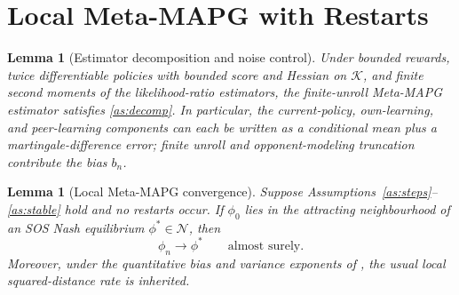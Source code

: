 \documentclass{article}
\theoremstyle{plain}
\newtheorem{lemma}[theorem]{Lemma}
\theoremstyle{definition}
\theoremstyle{remark}
\newcommand{\K}{\mathcal{K}}
\newcommand{\N}{\mathcal{N}}
\begin{document}
\section{Local Meta-MAPG with Restarts}\label{sec:main}

\begin{lemma}[Estimator decomposition and noise control]\label{lem:decomp}
Under bounded rewards, twice differentiable policies with bounded score and Hessian on $\K$, and finite second moments of the likelihood-ratio estimators, the finite-unroll Meta-MAPG estimator satisfies \cref{as:decomp}. In particular, the current-policy, own-learning, and peer-learning components can each be written as a conditional mean plus a martingale-difference error; finite unroll and opponent-modeling truncation contribute the bias $b_n$.
\end{lemma}

\begin{lemma}[Local Meta-MAPG convergence]\label{lem:local}
Suppose Assumptions~\ref{as:steps}--\ref{as:stable} hold and no restarts occur. If $\phi_0$ lies in the attracting neighbourhood of an SOS Nash equilibrium $\phi^\ast\in\N$, then
\[
\phi_n\to\phi^\ast\qquad\text{almost surely.}
\]
Moreover, under the quantitative bias and variance exponents of \citet{giannou2022convergence}, the usual local squared-distance rate is inherited.
\end{lemma}
\end{document}
